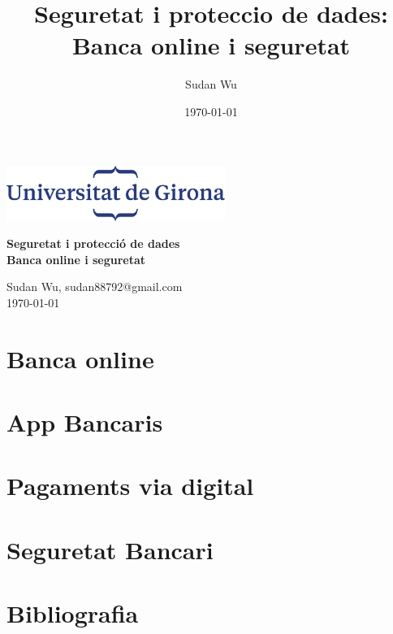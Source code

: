 \documentclass[12pt,a4paper]{article}
\title{Seguretat i proteccio de dades: Banca online i seguretat}
\author{Sudan Wu}
\date{\today}
\begin{document}
\begin{titlepage}
    \begin{center}
        \includegraphics[height=1.8cm]{logoUdG}\\\vfill
    \end{center}
    \center
    {\huge \bfseries Seguretat i protecció de dades}\\[0.5cm]
    {\Huge \bfseries Banca online i seguretat} \\
    \vfill
    \begin{center} \large
        {Sudan Wu, sudan88792@gmail.com} \\[0.25cm]
        {\today}\\ [1cm]
    \end{center}

\end{titlepage}

\tableofcontents


\clearpage
\section{Banca online}

\clearpage

\clearpage
\section{App Bancaris}


\clearpage
\section{Pagaments via digital}



\section{Seguretat Bancari}

\clearpage





\clearpage
\section{Bibliografia}

\end{document}
